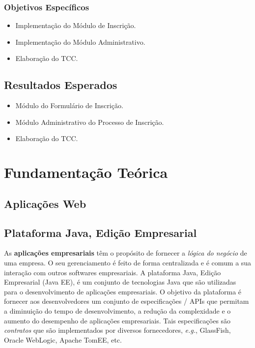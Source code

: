 \documentclass[
  10.5pt,				  %
	openright,			%
	twoside,			  %
  a5paper,
  chapter=TITLE,	%
	section=TITLE,	%
  hyphens,        %
	english,        %
	brazil          %
]{abntex2}
\begin{document}
\subsection{Objetivos Específicos}
\begin{itemize}
  \item Implementação do Módulo de Inscrição.
  \item Implementação do Módulo Administrativo.
  \item Elaboração do TCC.
\end{itemize}

\section{Resultados Esperados}
\begin{itemize}
  \item Módulo do Formulário de Inscrição.
  \item Módulo Administrativo do Processo de Inscrição.
  \item Elaboração do TCC.
\end{itemize}



\chapter{Fundamentação Teórica}

\section{Aplicações Web}


\section{Plataforma Java, Edição Empresarial}

As \textbf{aplicações empresariais} têm o propósito de fornecer a \emph{lógica do negócio} de uma empresa. O seu gerenciamento é feito de forma centralizada e é comum a sua interação com outros softwares empresariais. A plataforma Java, Edição Empresarial (Java EE), é um conjunto de tecnologias Java que são utilizadas para o desenvolvimento de aplicações empresariais. O objetivo da plataforma é fornecer aos desenvolvedores um conjunto de especificações / APIs que permitam a diminuição do tempo de desenvolvimento, a redução da complexidade e o aumento do desempenho de aplicações empresariais\cite{javaee7}. Tais especificações são \emph{contratos} que são implementados por diversos fornecedores, \emph{e.g.}, GlassFish, Oracle WebLogic, Apache TomEE, etc.
\end{document}
